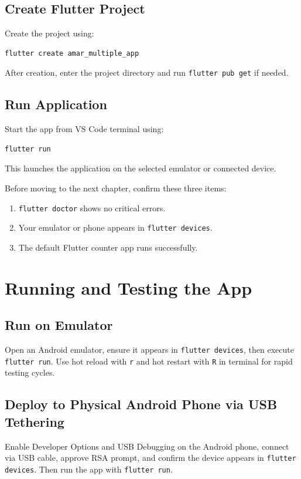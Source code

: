 \documentclass{article}
\begin{document}
\subsection{Create Flutter Project}
Create the project using:
\begin{lstlisting}[language=bash, caption={Create project command}]
flutter create amar_multiple_app
\end{lstlisting}
After creation, enter the project directory and run \texttt{flutter pub get} if needed.


\newpage
\subsection{Run Application}
Start the app from VS Code terminal using:
\begin{lstlisting}[language=bash, caption={Run app command}]
flutter run
\end{lstlisting}
This launches the application on the selected emulator or connected device.

\begin{featurebox}
Before moving to the next chapter, confirm these three items:
\begin{enumerate}
\item \texttt{flutter doctor} shows no critical errors.
\item Your emulator or phone appears in \texttt{flutter devices}.
\item The default Flutter counter app runs successfully.
\end{enumerate}
\end{featurebox}


\section{Running and Testing the App}

\subsection{Run on Emulator}
Open an Android emulator, ensure it appears in \texttt{flutter devices}, then execute \texttt{flutter run}. Use hot reload with \texttt{r} and hot restart with \texttt{R} in terminal for rapid testing cycles.

\subsection{Deploy to Physical Android Phone via USB Tethering}
Enable Developer Options and USB Debugging on the Android phone, connect via USB cable, approve RSA prompt, and confirm the device appears in \texttt{flutter devices}. Then run the app with \texttt{flutter run}.
\end{document}
